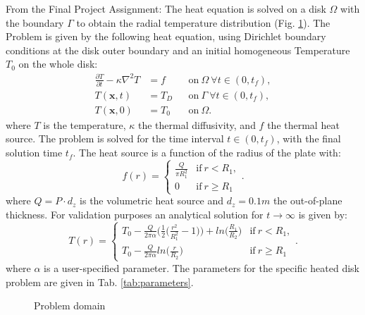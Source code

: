 \documentclass[a4paper, 11pt, oneside]{scrartcl}
\newcommand{\pp}[2]{\frac{\partial #1}{\partial #2}}%
\newcommand{\vect}[1]{\boldsymbol{\mathbf{#1}}}
\newcommand{\refFig}[1]{Fig. \ref{#1}}
\newcommand{\refTab}[1]{Tab. \ref{#1}}
\begin{document}
From the Final Project Assignment:
The heat equation is solved on a disk $\Omega$ with the boundary $\Gamma$ to obtain the radial temperature distribution (\refFig{fig::Domain}). The Problem is given by the following heat equation, using Dirichlet boundary conditions at the disk outer boundary and an initial homogeneous Temperature $T_0$ on the whole disk:
\begin{align}
	\label{eq:Heat}
	\pp{T}{t}-\kappa \nabla^2 T &= f &&\text{on} \ \Omega \ \forall t \in (0,t_f),\\
	T(\vect{x},t) &= T_D &&\text{on} \ \Gamma \ \forall t \in (0,t_f),\\
	T(\vect{x},0) &= T_0 &&\text{on} \ \Omega.
\end{align}
where $T$ is the temperature, $\kappa$ the thermal diffusivity, and $f$ the thermal heat source. The problem is solved for the time interval $t \in (0,t_f)$, with the final solution time $t_f$. The heat source is a function of the radius of the plate with:
\begin{equation}
	f(r) = \left\{\begin{array}{ll}\frac{Q}{\pi R_1^2} & \text{if} \ r < R_1, \\
			  0 & \text{if} \ r \geq R_1 \end{array}\right . .
\end{equation}
where $Q=P \cdot d_z$ is the volumetric heat source and $d_z = 0.1m $ the out-of-plane thickness. For validation purposes an analytical solution for $t \rightarrow \infty$ is given by:
\begin{equation}
		T(r) = \left\{\begin{array}{ll} T_0-\frac{Q}{2 \pi \alpha } \big(\frac{1}{2} \big(\frac{r^2}{R_1^2} - 1\big)\big)+ln\big(\frac{R_1}{R_2}\big) & \text{if} \ r < R_1, \\
		T_0 - \frac{Q}{2 \pi \alpha } ln\big(\frac{r}{R_2}\big)& \text{if} \ r \geq R_1 \end{array}\right . .
\end{equation}
where $\alpha$ is a user-specified parameter. The parameters for the specific heated disk problem are given in \refTab{tab:parameters}.

\begin{figure}[h!]
	\centering
	\caption{\label{fig::Domain} Problem domain}
\end{figure}
\end{document}
